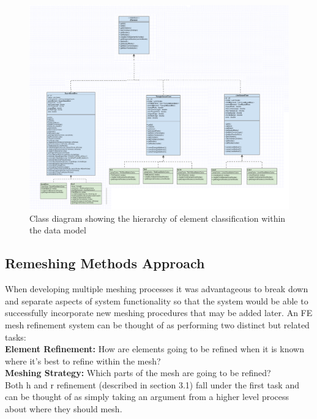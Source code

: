 \begin{landscape}

\begin{figure}[h]                                                   
  \centerline{\includegraphics[width=220mm, scale=1]{../Graphics/ElementHigerarchyDiagram2.png}}
  \caption{Class diagram showing the hierarchy of element classification within the data model}
  \label{fig:h-refinementImp}
\end{figure}
\end{landscape}


\subsection{Remeshing Methods Approach}
When developing multiple meshing processes it was advantageous to break down and separate aspects of system functionality so that the system would be able to successfully incorporate new meshing procedures that may be added later. An FE mesh refinement system can be thought of as performing two distinct but related tasks: \\ 

\noindent
\textbf{Element Refinement: } How are elements going to be refined when it is known where it's best to refine within the mesh? \\

\noindent
\textbf{Meshing Strategy: } Which parts of the mesh are going to be refined? \\ 

\noindent
Both h and r refinement (described in section 3.1) fall under the first task and can be thought of as simply taking an argument from a higher level process about where they should mesh. \\

